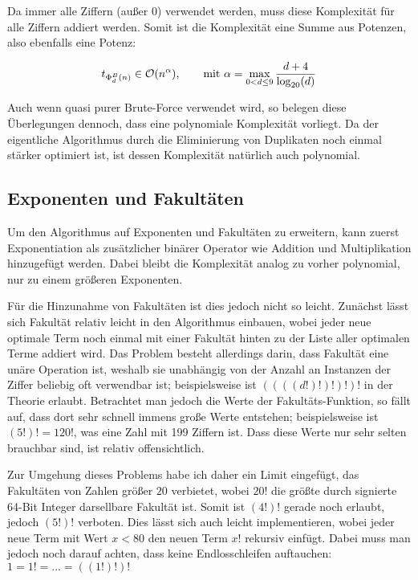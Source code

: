 \documentclass{article}
\theoremstyle{nonumberplain}
\begin{document}
Da immer alle Ziffern (außer 0) verwendet werden, muss diese Komplexität für alle Ziffern addiert werden.
Somit ist die Komplexität eine Summe aus Potenzen, also ebenfalls eine Potenz:

\[t_{\Phi_{d}^{B}(n)} \in \mathcal{O}(n^{\alpha}),\qquad\text{mit }\alpha=\max_{0 < d \leq 9}\frac{d+4}{\log_{20}(d)}\]

Auch wenn quasi purer Brute-Force verwendet wird, so belegen diese Überlegungen dennoch, dass eine polynomiale Komplexität vorliegt.
Da der eigentliche Algorithmus durch die Eliminierung von Duplikaten noch einmal stärker optimiert ist, ist dessen Komplexität natürlich auch polynomial.

\subsection{Exponenten und Fakultäten}

Um den Algorithmus auf Exponenten und Fakultäten zu erweitern, kann zuerst Exponentiation als zusätzlicher binärer Operator wie Addition und Multiplikation hinzugefügt werden.
Dabei bleibt die Komplexität analog zu vorher polynomial, nur zu einem größeren Exponenten.

Für die Hinzunahme von Fakultäten ist dies jedoch nicht so leicht.
Zunächst lässt sich Fakultät relativ leicht in den Algorithmus einbauen, wobei jeder neue optimale Term noch einmal mit einer Fakultät hinten zu der Liste aller optimalen Terme addiert wird.
Das Problem besteht allerdings darin, dass Fakultät eine unäre Operation ist, weshalb sie unabhängig von der Anzahl an Instanzen der Ziffer beliebig oft verwendbar ist; beispielsweise ist \(((((d!)!)!)!)!\) in der Theorie erlaubt.
Betrachtet man jedoch die Werte der Fakultäts-Funktion, so fällt auf, dass dort sehr schnell immens große Werte entstehen; beispielsweise ist \((5!)!=120!\), was eine Zahl mit 199 Ziffern ist.
Dass diese Werte nur sehr selten brauchbar sind, ist relativ offensichtlich.

Zur Umgehung dieses Problems habe ich daher ein Limit eingefügt, das Fakultäten von Zahlen größer \(20\) verbietet, wobei \(20!\) die größte durch signierte 64-Bit Integer darsellbare Fakultät ist.
Somit ist \((4!)!\) gerade noch erlaubt, jedoch \((5!)!\) verboten.
Dies lässt sich auch leicht implementieren, wobei jeder neue Term mit Wert \(x < 80\) den neuen Term \(x!\) rekursiv einfügt.
Dabei muss man jedoch noch darauf achten, dass keine Endlosschleifen auftauchen: \(1 = 1! = \ldots = ((1!)!)!\)
\end{document}
